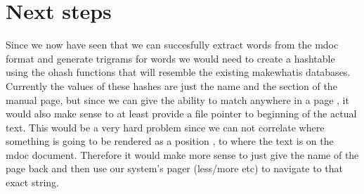 \documentclass{report}
\begin{document}
\section*{Next steps}
Since we now have seen that we can succesfully extract words from the mdoc format and generate trigrams for words we would need to create a hashtable using the ohash functions
that will resemble the existing makewhatis databases. Currently the values of these hashes are just the name and the section of the manual page, but since we can give the ability
to match anywhere in a page , it would also make sense to at least provide a file pointer to beginning of the actual text. This would be a very hard problem since we can not
correlate where something is going to be rendered as a position , to where the text is on the mdoc document. Therefore it would make more sense to just give the name of the 
page back and then use our system's pager (less/more etc) to navigate to that exact string. 
\end{document}
